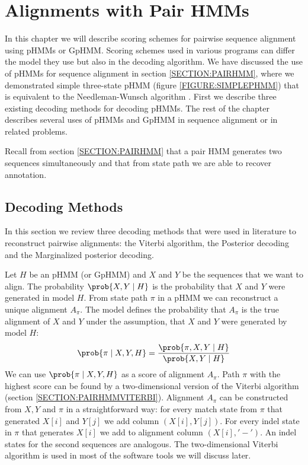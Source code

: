 \chapter{Alignments with Pair HMMs}\label{CHAPTER:PAIRHMM}

In this chapter we will describe scoring schemes for pairwise sequence alignment
using pHMMs or GpHMM. Scoring schemes used in various programs can differ the
model they use but also in the decoding algorithm. 
We have discussed the use of pHMMs for sequence alignment in section
\ref{SECTION:PAIRHMM}, where we demonstrated  simple three-state pHMM (figure
\ref{FIGURE:SIMPLEPHMM}) that is equivalent to the
Needleman-Wunsch algorithm \cite{Durbin1998}.  First we 
describe three existing  decoding methods for decoding pHMMs.
The rest of the chapter describes several uses of pHMMs and GpHMM in sequence
alignment or in related problems.

Recall from section \ref{SECTION:PAIRHMM} that a pair HMM generates two
sequences simultaneously and that from state path we are able to recover
annotation.



\section{Decoding Methods}

In this section we review three decoding methods that were used in literature to
reconstruct pairwise alignments: the Viterbi algorithm, the Posterior
decoding and the Marginalized posterior decoding.

Let $H$ be an pHMM (or GpHMM) and $X$ and $Y$ be the sequences that we want to
align. The probability $\prob{X,Y\mid H}$ is the probability that $X$ and $Y$
were generated in model $H$.  From state path $\pi$ in a pHMM  we can
reconstruct a unique alignment $A_{\pi}$. The model defines the probability 
that
$A_{\pi}$ is the true alignment of $X$ and $Y$ under the assumption, that $X$ and $Y$ were
generated by model $H$:
  \[\prob{\pi\mid
X,Y,H}=\frac{\prob{\pi,X,Y\mid H}}{\prob{X,Y\mid H}}\]
  We can use $\prob{\pi\mid X,Y,H}$ as a score of 
alignment $A_{\pi}$. Path $\pi$ with the highest score can be found by a
two-dimensional version of the Viterbi
algorithm (section \ref{SECTION:PAIRHMMVITERBI}). Alignment $A_{\pi}$ can be
constructed from $X,Y$ and $\pi$ in a straightforward
way: for every match state from $\pi$ that generated $X[i]$ and $Y[j]$ we add
column $(X[i],Y[j])$. For every indel state in $\pi$ that generates $X[i]$ we
add to alignment column $(X[i],'-')$. An indel states for the second sequences are
analogous.  The two-dimensional Viterbi algorithm is used in  most of the
software tools we will discuss later.

